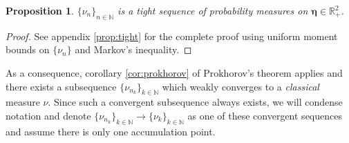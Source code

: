 \documentclass[a4paper,11pt]{article}
\theoremstyle{plain}
\newtheorem{prop}[thm]{Proposition}
\theoremstyle{definition}
\theoremstyle{remark}
\newcommand{\bs}[1]{\boldsymbol{#1}}
\begin{document}
\begin{prop}
\label{tightnessofmeasuresequence}
$\{\nu_n\}_{n \in \mathbb{N}}$ is a tight sequence of probability measures on $\bs{\eta} \in \mathbb{R}^2_+$. 
\end{prop}
\begin{proof}
    See appendix \ref{prop:tight} for the complete proof using uniform moment bounds on $\{\nu_n\}$ and Markov's inequality.
\end{proof}
\noindent As a consequence, corollary \ref{cor:prokhorov} of Prokhorov's theorem applies and there exists a subsequence $\{\nu_{n_k}\}_{k\in\mathbb{N}}$ which weakly converges to a \textit{classical} measure $\nu$. Since such a convergent subsequence always exists, we will condense notation and denote $\{\nu_{n_k}\}_{k\in\mathbb{N}} \to \{\nu_k\}_{k\in\mathbb{N}}$ as one of these convergent sequences and assume there is only one accumulation point. 
\end{document}
